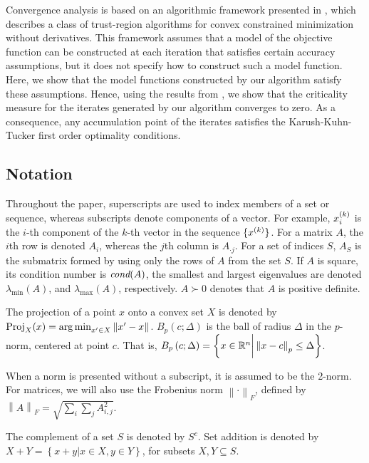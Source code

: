 \documentclass{article}
\begin{document}
Convergence analysis is based on an algorithmic framework presented in \cite{Conejo:2013:GCT:2620806.2621814},  which describes a class of trust-region algorithms for convex constrained minimization without derivatives.   This framework assumes that a model of the objective function can be constructed at each iteration that satisfies certain accuracy assumptions, but it does not specify how to construct such a model function.    Here, we show that the model functions constructed by our algorithm satisfy these assumptions.  Hence,  using the results from \cite{Conejo:2013:GCT:2620806.2621814}, we show that
the criticality measure for the iterates generated by our algorithm converges to zero.  As a consequence, any accumulation point of the iterates satisfies the Karush-Kuhn-Tucker first order optimality conditions.  


\subsection{Notation}

Throughout the paper, superscripts are used to index members of a set or sequence, whereas subscripts denote components of a vector.  For example,  
$x_i^{(k)}$ is the $i$-th component of the $k$-th vector in the sequence $\{x^{(k)}\}$.
For a matrix $A$,  the $i$th row is denoted $A_i$, whereas the $j$th column is $A_{\cdot j}$.  
For a set of indices $S$,  $A_S$ is the submatrix formed by using only the rows of $A$ from the set $S$.   If $A$ is square, its condition number is $\textit{cond}(A)$, the smallest and largest eigenvalues are denoted 
$\lambda_{\text{min}}(A)$, and $\lambda_{\text{max}}(A)$, respectively.  $A \succ 0$ denotes that $A$ is positive definite.  

The projection of a point $x$ onto a convex set $X$ is denoted by ${\textrm{Proj}}_X(x) = \operatorname*{arg\,min}_{x' \in X}\left\|x' - x\right\|$.  $B_p\left(c; \Delta\right)$ is the ball of radius $\Delta$ in the $p$-norm, centered at point $c$.  That is,  $B_p\left(c; \Delta\right) = \left\{x \in \mathbb R^n \bigg | \left\|x - c\right\|_p \le \Delta \right\}$.

When a norm is presented without a subscript, it is assumed to be the 2-norm.  For matrices, we will also use the Frobenius norm $\left\|\cdot\right\|_F$, defined by $\left\|A\right\|_F = \sqrt{\sum_i\sum_jA_{i, j}^2}$.

The complement of a set $S$ is denoted by $S^c$.   
Set addition is denoted by $X + Y = \left\{x + y | x \in X, y \in Y\right\}$, for subsets $X,Y \subseteq S$.
\end{document}
